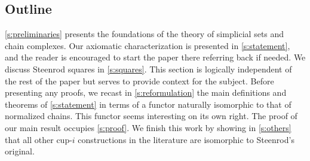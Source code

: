 \subsection*{Outline}

\cref{s:preliminaries} presents the foundations of the theory of simplicial sets and chain complexes.
Our axiomatic characterization is presented in \cref{s:statement}, and the reader is encouraged to start the paper there referring back if needed.
We discuss Steenrod squares in \cref{s:squares}.
This section is logically independent of the rest of the paper but serves to provide context for the subject.
Before presenting any proofs, we recast in \cref{s:reformulation} the main definitions and theorems of \cref{s:statement} in terms of a functor naturally isomorphic to that of normalized chains.
This functor seems interesting on its own right.
The proof of our main result occupies \cref{s:proof}.
We finish this work by showing in \cref{s:others} that all other cup-$i$ constructions in the literature are isomorphic to Steenrod's original.

